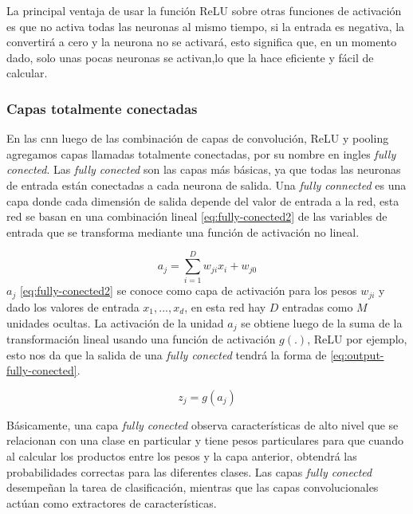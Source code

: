 La principal ventaja de usar la función ReLU sobre otras funciones de activación es que no activa todas las neuronas al mismo tiempo, si la entrada es negativa, la convertirá a cero y la neurona no se activará, esto significa que, en un momento dado, solo unas pocas neuronas se activan,lo que la hace eficiente y fácil de calcular.


\subsubsection{Capas totalmente conectadas}\label{sub:fully_connected}

En las \ac{cnn} luego de las combinación de capas de convolución, ReLU y pooling agregamos capas llamadas totalmente conectadas, por su nombre en ingles \textit{fully conected}.
Las \textit{fully conected} son las capas más básicas, ya que todas las neuronas de entrada están conectadas a cada neurona de salida. Una \textit{fully connected }  es una capa donde cada dimensión de salida  depende del valor de entrada a la red, esta red se basan en una combinación lineal \ref{eq:fully-conected2} de las variables de entrada que se transforma mediante una función de activación no lineal.


\begin{equation}\label{eq:fully-conected2}
a_j = \sum_{i=1}^D w_{ji}  x_i + w_{j0}
\end{equation}
$ a_j$ \ref{eq:fully-conected2}  se conoce como capa de activación para los pesos $w_{ji}$ y dado los valores de entrada ${x_1,...,x_d}$, en esta red hay  $ D$ entradas como $M$ unidades ocultas. La activación de la unidad  $ a_j$ se obtiene luego de la suma de la transformación lineal usando una función de activación $ g(.)$, ReLU por ejemplo, esto nos da que la salida de una \textit{fully conected} tendrá la forma de  \ref{eq:output-fully-conected}.

\begin{equation}\label{eq:output-fully-conected}
z_j = g(a_j)
\end{equation}

Básicamente, una capa \textit{fully conected} observa características de alto nivel que se relacionan con una clase en particular y tiene pesos particulares para que cuando al calcular los productos entre los pesos y la capa anterior, obtendrá las probabilidades correctas para las diferentes clases. Las capas \textit{fully conected }desempeñan  la tarea de clasificación, mientras que las capas convolucionales actúan como extractores de características.

